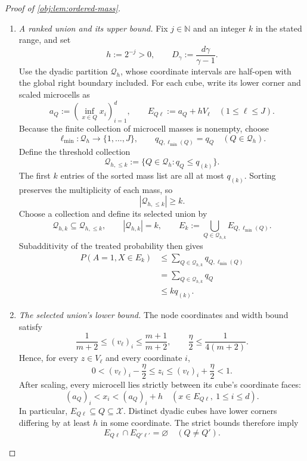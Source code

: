\documentclass[11pt]{article}
\begin{document}
\begin{proof}[Proof of \cref{obj:lem:ordered-mass}]
\begin{enumerate}
Combining these bounds, using \(F_E\ge0\) and \(s_E\le1\), proves
\[
\begin{aligned}
\frac{\gamma-1}{\gamma}\,
C^{-1/(\gamma-1)}u^{\gamma/(\gamma-1)}
&\le \int_0^{s_E}F_E(t)\,dt\\
&\le \int_0^1F_E(t)\,dt\\
&=P(A=1,X\in E).
\end{aligned}
\]

\item \emph{A ranked union and its upper bound.}
Fix \(j\in\mathbb N\) and an integer \(k\) in the stated range, and set
\[
h:=2^{-j}>0,
\qquad
D_\gamma:=\frac{d\gamma}{\gamma-1}.
\]
Use the dyadic partition \(\mathcal Q_h\), whose coordinate intervals are half-open with the global right boundary included. For each cube, write its lower corner and scaled microcells as
\[
a_Q:=\left(\inf_{x\in Q}x_i\right)_{i=1}^d,
\qquad
E_{Q\ell}:=a_Q+hV_\ell
\quad(1\le\ell\le J).
\]
Because the finite collection of microcell masses is nonempty, choose
\[
\ell_{\min}:\mathcal Q_h\longrightarrow\{1,\ldots,J\},
\qquad
q_{Q,\ell_{\min}(Q)}=q_Q
\quad(Q\in\mathcal Q_h).
\]
Define the threshold collection
\[
\mathcal Q_{h,\le k}
:=
\{Q\in\mathcal Q_h:q_Q\le q_{(k)}\}.
\]
The first \(k\) entries of the sorted mass list are all at most \(q_{(k)}\). Sorting preserves the multiplicity of each mass, so
\[
|\mathcal Q_{h,\le k}|\ge k.
\]
Choose a collection and define its selected union by
\[
\mathcal Q_{h,k}\subseteq\mathcal Q_{h,\le k},
\qquad
|\mathcal Q_{h,k}|=k,
\qquad
E_k:=\bigcup_{Q\in\mathcal Q_{h,k}}E_{Q,\ell_{\min}(Q)}.
\]
Subadditivity of the treated probability then gives
\[
\begin{aligned}
P(A=1,X\in E_k)
&\le
\sum_{Q\in\mathcal Q_{h,k}}
q_{Q,\ell_{\min}(Q)}\\
&=
\sum_{Q\in\mathcal Q_{h,k}}q_Q\\
&\le kq_{(k)}.
\end{aligned}
\]

\item \emph{The selected union's lower bound.}
The node coordinates and width bound satisfy
\[
\frac1{m+2}\le(v_\ell)_i\le\frac{m+1}{m+2},
\qquad
\frac\eta2\le\frac1{4(m+2)}.
\]
Hence, for every \(z\in V_\ell\) and every coordinate \(i\),
\[
0<(v_\ell)_i-\frac\eta2
\le z_i
\le(v_\ell)_i+\frac\eta2<1.
\]
After scaling, every microcell lies strictly between its cube's coordinate faces:
\[
(a_Q)_i<x_i<(a_Q)_i+h
\quad(x\in E_{Q\ell},\ 1\le i\le d).
\]
In particular, \(E_{Q\ell}\subseteq Q\subseteq\mathcal X\). Distinct dyadic cubes have lower corners differing by at least \(h\) in some coordinate. The strict bounds therefore imply
\[
E_{Q\ell}\cap E_{Q'\ell'}=\varnothing
\quad(Q\ne Q').
\]


\end{enumerate}
\end{proof}
\end{document}
